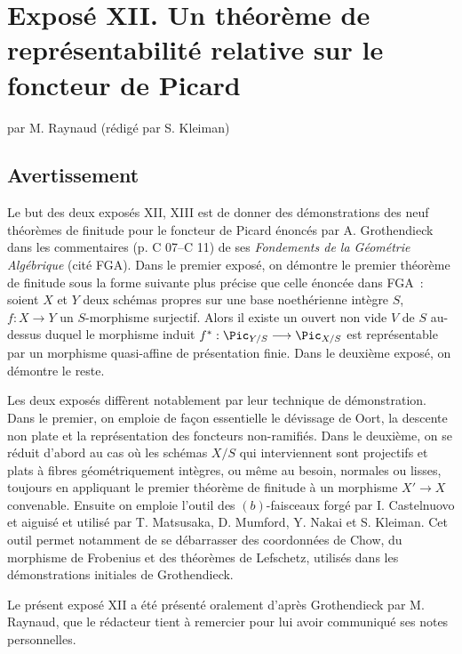 \section*{Exposé XII. Un théorème de représentabilité relative sur le foncteur de Picard}
\begin{center}
par M. Raynaud (rédigé par S. Kleiman)
\end{center}

\subsection*{Avertissement}

Le but des deux exposés XII, XIII est de donner des démonstrations des neuf théorèmes de finitude pour le foncteur de Picard énoncés par A. Grothendieck dans les commentaires (p. C 07--C 11) de ses \emph{Fondements de la Géométrie Algébrique} (cité FGA). Dans le premier exposé, on démontre le premier théorème de finitude sous la forme suivante plus précise que celle énoncée dans FGA~: soient \(X\) et \(Y\) deux schémas propres sur une base noethérienne intègre \(S\), \(f:X\longrightarrow Y\) un \(S\)-morphisme surjectif. Alors il existe un ouvert non vide \(V\) de \(S\) au-dessus duquel le morphisme induit \(f^*:\Pic_{Y/S}\longrightarrow \Pic_{X/S}\) est représentable par un morphisme quasi-affine de présentation finie. Dans le deuxième exposé, on démontre le reste.

Les deux exposés diffèrent notablement par leur technique de démonstration. Dans le premier, on emploie de façon essentielle le dévissage de Oort, la descente non plate et la représentation des foncteurs non-ramifiés. Dans le deuxième, on se réduit d'abord au cas où les schémas \(X/S\) qui interviennent sont projectifs et plats à fibres géométriquement intègres, ou même au besoin, normales ou lisses, toujours en appliquant le premier théorème de finitude à un morphisme \(X'\to X\) convenable. Ensuite on emploie l'outil des \((b)\)-faisceaux forgé par I. Castelnuovo et aiguisé et utilisé par T. Matsusaka, D. Mumford, Y. Nakai et S. Kleiman. Cet outil permet notamment de se débarrasser des coordonnées de Chow, du morphisme de Frobenius et des théorèmes de Lefschetz, utilisés dans les démonstrations initiales de Grothendieck.

Le présent exposé XII a été présenté oralement d'après Grothendieck par M. Raynaud, que le rédacteur tient à remercier pour lui avoir communiqué ses notes personnelles.

